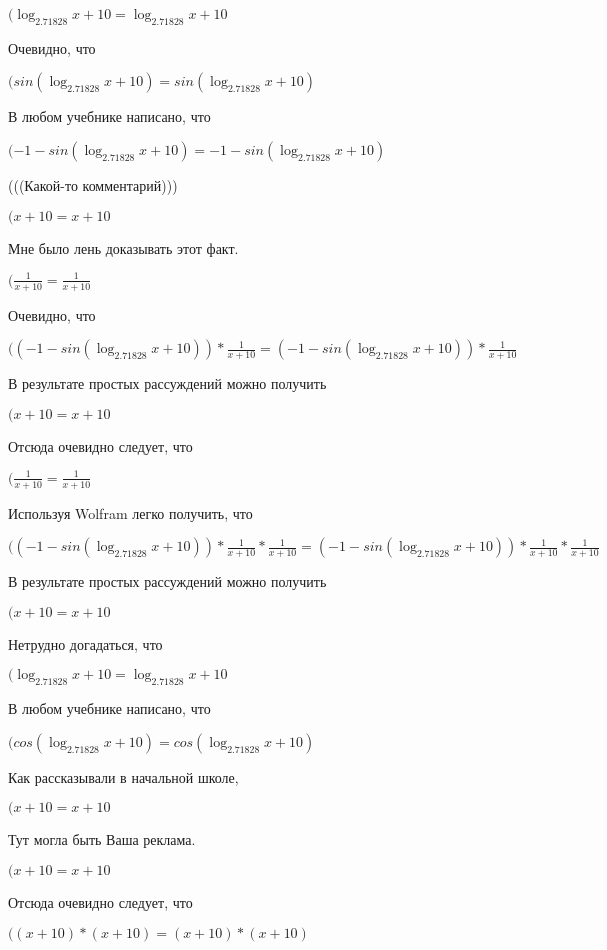 \documentclass[12pt,a4paper,fleqn]{article}
\theoremstyle{definition}
\begin{document}
$(\log_{ 2.71828 }{ x  +  10 } = \log_{ 2.71828 }{ x  +  10 }$

Очевидно, что

$(sin(\log_{ 2.71828 }{ x  +  10 }) = sin(\log_{ 2.71828 }{ x  +  10 })$

В любом учебнике написано, что

$( -1  - sin(\log_{ 2.71828 }{ x  +  10 }) =  -1  - sin(\log_{ 2.71828 }{ x  +  10 })$

(((Какой-то комментарий)))

$( x  +  10  =  x  +  10 $

Мне было лень доказывать этот факт.

$(\frac{ 1 }{ x  +  10 }
 = \frac{ 1 }{ x  +  10 }
$

Очевидно, что

$(( -1  - sin(\log_{ 2.71828 }{ x  +  10 })) * \frac{ 1 }{ x  +  10 }
 = ( -1  - sin(\log_{ 2.71828 }{ x  +  10 })) * \frac{ 1 }{ x  +  10 }
$

В результате простых рассуждений можно получить

$( x  +  10  =  x  +  10 $

Отсюда очевидно следует, что

$(\frac{ 1 }{ x  +  10 }
 = \frac{ 1 }{ x  +  10 }
$

Используя Wolfram легко получить, что

$(( -1  - sin(\log_{ 2.71828 }{ x  +  10 })) * \frac{ 1 }{ x  +  10 }
 * \frac{ 1 }{ x  +  10 }
 = ( -1  - sin(\log_{ 2.71828 }{ x  +  10 })) * \frac{ 1 }{ x  +  10 }
 * \frac{ 1 }{ x  +  10 }
$

В результате простых рассуждений можно получить

$( x  +  10  =  x  +  10 $

Нетрудно догадаться, что

$(\log_{ 2.71828 }{ x  +  10 } = \log_{ 2.71828 }{ x  +  10 }$

В любом учебнике написано, что

$(cos(\log_{ 2.71828 }{ x  +  10 }) = cos(\log_{ 2.71828 }{ x  +  10 })$

Как рассказывали в начальной школе,

$( x  +  10  =  x  +  10 $

Тут могла быть Ваша реклама.

$( x  +  10  =  x  +  10 $

Отсюда очевидно следует, что

$(( x  +  10 ) * ( x  +  10 ) = ( x  +  10 ) * ( x  +  10 )$
\end{document}
